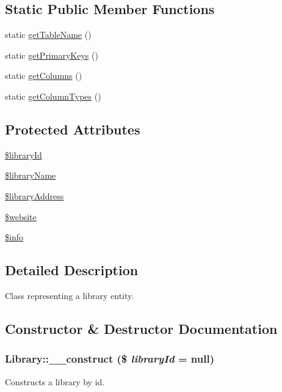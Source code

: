 \subsection*{Static Public Member Functions}
\begin{DoxyCompactItemize}
\item 
static \hyperlink{classLibrary_a0b5dbae3b3d7138ad86c7df6e6a433eb}{getTableName} ()
\item 
static \hyperlink{classLibrary_a026a18e3d13f83be2ee85221156f7864}{getPrimaryKeys} ()
\item 
static \hyperlink{classLibrary_ab67ca6733ca346dccb066c7333ef3426}{getColumns} ()
\item 
static \hyperlink{classLibrary_aa18ef5cf611b855ccbe55283b41e93b6}{getColumnTypes} ()
\end{DoxyCompactItemize}
\subsection*{Protected Attributes}
\begin{DoxyCompactItemize}
\item 
\hyperlink{classLibrary_a54b997a065042081ebc9b3b636a37191}{\$libraryId}
\item 
\hyperlink{classLibrary_a9b8bf43c7a46c1cee209579a530ea25b}{\$libraryName}
\item 
\hyperlink{classLibrary_ae0971e71837cc3270e95ad59910b8570}{\$libraryAddress}
\item 
\hyperlink{classLibrary_ac1629c45731a1f498dbf69908d80f390}{\$website}
\item 
\hyperlink{classLibrary_afd004ebf7293b3b1b3be5afccb5eb396}{\$info}
\end{DoxyCompactItemize}


\subsection{Detailed Description}
Class representing a library entity. 

\subsection{Constructor \& Destructor Documentation}
\hypertarget{classLibrary_a448367379e1917a080692b9f7d09b2af}{
\subsubsection[{\_\-\_\-construct}]{\setlength{\rightskip}{0pt plus 5cm}Library::\_\-\_\-construct (\$ {\em libraryId} = {\ttfamily null})}}
\label{classLibrary_a448367379e1917a080692b9f7d09b2af}
Constructs a library by id.


